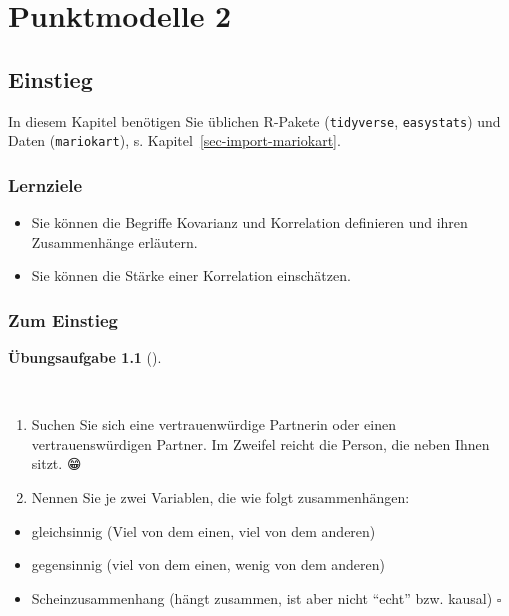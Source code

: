 \documentclass[
  letterpaper,
  oneside,
  open=any]{scrbook}
\providecommand{\tightlist}{%
  \setlength{\itemsep}{0pt}\setlength{\parskip}{0pt}}\usepackage{longtable,booktabs,array}
\theoremstyle{definition}
\newtheorem{exercise}{Übungsaufgabe}[chapter]
\theoremstyle{definition}
\theoremstyle{definition}
\theoremstyle{remark}
\begin{document}
\chapter{Punktmodelle 2}\label{sec-zusammenhaenge}

\section{Einstieg}\label{einstieg-7}

In diesem Kapitel benötigen Sie üblichen R-Pakete (\texttt{tidyverse},
\texttt{easystats}) und Daten (\texttt{mariokart}), s.
Kapitel~\ref{sec-import-mariokart}.

\subsection{Lernziele}\label{lernziele-7}

\begin{itemize}
\tightlist
\item
  Sie können die Begriffe Kovarianz und Korrelation definieren und ihren
  Zusammenhänge erläutern.
\item
  Sie können die Stärke einer Korrelation einschätzen.
\end{itemize}

\subsection{Zum Einstieg}\label{zum-einstieg}

\begin{exercise}[]\protect\hypertarget{exr-zsgh-studis}{}\label{exr-zsgh-studis}

~

\begin{enumerate}
\def\labelenumi{\arabic{enumi}.}
\tightlist
\item
  Suchen Sie sich eine vertrauenwürdige Partnerin oder einen
  vertrauenswürdigen Partner. Im Zweifel reicht die Person, die neben
  Ihnen sitzt. {😁}
\item
  Nennen Sie je zwei Variablen, die wie folgt zusammenhängen:
\end{enumerate}

\begin{itemize}
\tightlist
\item
  gleichsinnig (Viel von dem einen, viel von dem anderen)
\item
  gegensinnig (viel von dem einen, wenig von dem anderen)
\item
  Scheinzusammenhang (hängt zusammen, ist aber nicht \enquote{echt} bzw.
  kausal) \(\square\)
\end{itemize}

\end{exercise}
\end{document}
